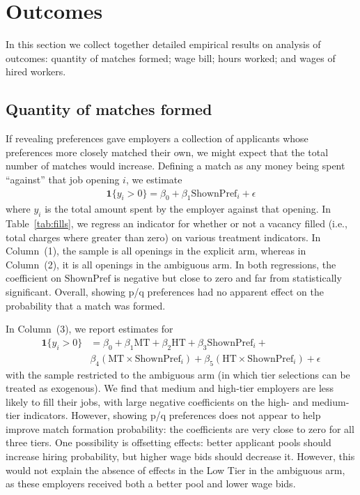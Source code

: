\documentclass[prodmode,acmec]{ec-acmsmall}
\newcommand{\important}[1]{#1}
\begin{document}
\section{Outcomes}
\label{sec:outcomes_app}

In this section we collect together detailed empirical results on analysis of outcomes: quantity of matches formed; wage bill; hours worked; and wages of hired workers.

\subsection{Quantity of matches formed} 
If revealing preferences gave employers a collection of applicants whose preferences more closely matched their own, we might expect that the total number of matches would increase.
Defining a match as any money being spent ``against'' that job opening $i$, we estimate 
\begin{align} \label{eq:fill}
\mathbf{1}\{y_i > 0\} = \beta_0 + \beta_1 \mbox{ShownPref}_i + \epsilon 
\end{align} 
where $y_i$ is the total amount spent by the employer against that opening.
In Table~\ref{tab:fills}, we regress an indicator for whether or not a vacancy filled (i.e., total charges where greater than zero) on various treatment indicators. 
In Column~(1), the sample is all openings in the explicit arm, whereas in Column~(2), it is all openings in the ambiguous arm. 
In both regressions, the coefficient on $\mbox{ShownPref}$ is negative but close to zero and far from statistically significant. 
\important{Overall, showing p/q preferences had no apparent effect on the probability that a match was formed.}

In Column~(3), we report estimates for
\begin{align} \label{eq:filli}
\mathbf{1}\{y_i > 0\} & = \beta_0 + \beta_1 \mbox{MT} + \beta_2 \mbox{HT} + \beta_3 \mbox{ShownPref}_i + \nonumber\\  
                      & \beta_4 \left(\mbox{MT} \times \mbox{ShownPref}_i \right) + \beta_5 \left(\mbox{HT} \times \mbox{ShownPref}_i\right) + \epsilon  
\end{align} 
with the sample restricted to the ambiguous arm (in which tier selections can be treated as exogenous).
\important{We find that medium and high-tier employers are less likely to fill their jobs, with large negative coefficients on the high- and medium-tier indicators.}
\important{However, showing p/q preferences does not appear to help improve match formation probability: the coefficients are very close to zero for all three tiers.}
One possibility is offsetting effects:
better applicant pools should increase hiring probability, but higher wage bids should decrease it.
However, this would not explain the absence of effects in the Low Tier in the ambiguous arm, as these employers received both a better pool and lower wage bids. 
\end{document}
